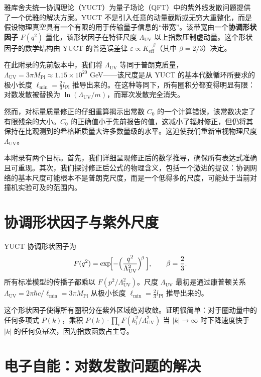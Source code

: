 \documentclass[11pt,a4paper]{article}
\newcommand{\Mpl}{M_{\mathrm{Pl}}}
\newcommand{\Lpl}{l_{\mathrm{Pl}}}
\newcommand{\Lmin}{\ell_{\min}}
\newcommand{\LUV}{\Lambda_{\mathrm{UV}}}
\theoremstyle{remark}
\begin{document}
	雅库舍夫统一协调理论（YUCT）为量子场论（QFT）中的紫外线发散问题提供了一个优雅的解决方案。YUCT 不是引入任意的动量截断或无穷大重整化，而是假设物理真空具有一个有限的用于传输量子信息的“带宽”。该带宽由一个\textbf{协调形状因子} \(F(q^2)\) 量化，该形状因子在特征尺度 \(\LUV\) 以上指数压制虚动量。这个形状因子的数学结构由 YUCT 的普适误差律 \(\varepsilon \propto K_{\mathrm{eff}}^{-\beta}\)（其中 \(\beta = 2/3\)）决定。
	
	在此附录的先前版本中，我们将 \(\LUV\) 等同于普朗克质量，\(\LUV = 3\pi\Mpl \approx 1.15\times 10^{20}\) GeV——该尺度是从 YUCT 的基本代数循环所要求的极小长度 \(\Lmin = \frac{2}{3}\Lpl\) 推导出来的。在这种等同下，所有圈积分都变得明显有限：对数发散被替换为 \(\ln(\LUV/m)\)，而幂次发散完全消失。
	
	然而，对标量质量修正的仔细重算揭示出常数 \(C_0\) 的一个计算错误，该常数决定了有限残余的大小。\(C_0\) 的正确值小于先前报告的值，这减小了辐射修正，但仍将其保持在比观测到的希格斯质量大许多数量级的水平。这迫使我们重新审视物理尺度 \(\LUV\)。
	
	本附录有两个目标。首先，我们详细呈现修正后的数学推导，确保所有表达式准确且可重现。其次，我们探讨修正后公式的物理含义，包括一个激进的提议：协调网络的基本尺度可能根本不是普朗克尺度，而是一个低得多的尺度，可能处于当前对撞机实验可及的范围内。
	
	\section{协调形状因子与紫外尺度}
	\label{sec:formfactor}
	
	YUCT 协调形状因子为
	\begin{equation}
		F(q^2) = \exp\!\Bigl[-\Bigl(\frac{q^2}{\LUV^2}\Bigr)^{\!\beta}\,\Bigr], \qquad \beta = \frac{2}{3}.
		\label{eq:F}
	\end{equation}
	所有标准模型的传播子都乘以 \(F(p^2/\LUV^2)\)。尺度 \(\LUV\) 最初是通过康普顿关系 \(\LUV = 2\pi\hbar c/\Lmin = 3\pi\Mpl\) 从极小长度 \(\Lmin = \frac{2}{3}\Lpl\) 推导出来的。
	
	这个形状因子使得所有圈积分在紫外区域绝对收敛。证明很简单：对于圈动量中的任何多项式 \(P(k)\)，乘积 \(P(k) \cdot \prod_i F(k_i^2/\LUV^2)\) 当 \(|k| \to \infty\) 时下降速度快于 \(|k|\) 的任何负幂次，因为指数函数占主导。
	
	\section{电子自能：对数发散问题的解决}
	\label{sec:electron}
	
\end{document}
